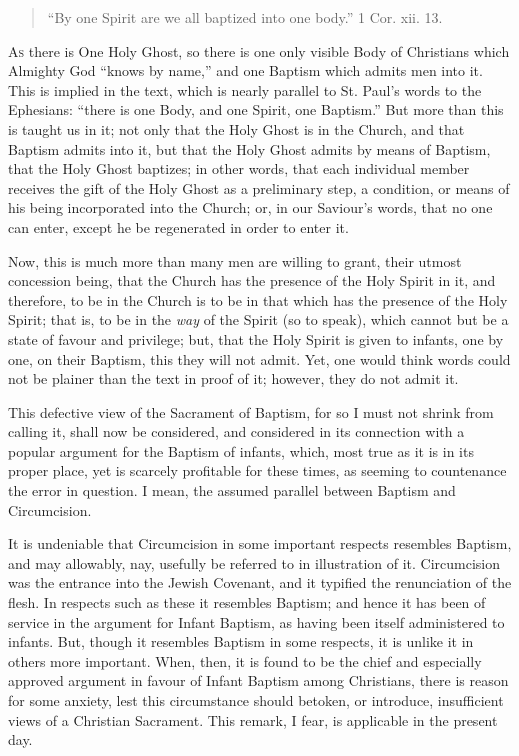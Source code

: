 
\begin{quote}

``By one Spirit are we all baptized into one
body.'' 1 Cor. xii. 13.

\end{quote}

A\textsc{s} there is One Holy Ghost, so there is one only visible Body of
Christians which Almighty God ``knows by name,'' and one
Baptism which admits men into it. This is implied in the text, which
is nearly parallel to St. Paul's words to the Ephesians: ``there
is one Body, and one Spirit, one Baptism.'' But more than this is
taught us in it; not only that the Holy Ghost is in the Church, and
that Baptism admits into it, but that the Holy Ghost admits by means
of Baptism, that the Holy Ghost baptizes; in other words, that each
individual member receives the gift of the Holy Ghost as a preliminary
step, a condition, or means of his being incorporated into the Church;
or, in our Saviour's words, that no one can enter, except he be
regenerated in order to enter it.

Now, this is much more than many men are willing to grant, their
utmost concession being, that the Church has the presence of the Holy
Spirit in it, and therefore, to be in the Church is to be in that
which has the presence of the Holy Spirit; that is, to be in the \emph{way}
of the Spirit (so to speak), which cannot but be a state of favour and
privilege; but, that the Holy Spirit is given to infants, one by one,
on their Baptism, this they will not admit. Yet, one would think words
could not be plainer than the text in proof of it; however, they do
not admit it.

This defective view of the Sacrament of Baptism, for so I must not
shrink from calling it, shall now be considered, and considered in its
connection with a popular argument for the Baptism of infants, which,
most true as it is in its proper place, yet is scarcely profitable for
these times, as seeming to countenance the error in question. I mean,
the assumed parallel between Baptism and Circumcision.

It is undeniable that Circumcision in some important respects
resembles Baptism, and may allowably, nay, usefully be referred to in
illustration of it. Circumcision was the entrance into the Jewish
Covenant, and it typified the renunciation of the flesh. In respects
such as these it resembles Baptism; and hence it has been of service
in the argument for Infant Baptism, as having been itself administered
to infants. But, though it resembles Baptism in some respects, it is
unlike it in others more important. When, then, it is found to be the
chief and especially approved argument in favour of Infant Baptism
among Christians, there is reason for some anxiety, lest this
circumstance should betoken, or introduce, insufficient views of a
Christian Sacrament. This remark, I fear, is applicable in the present
day.

